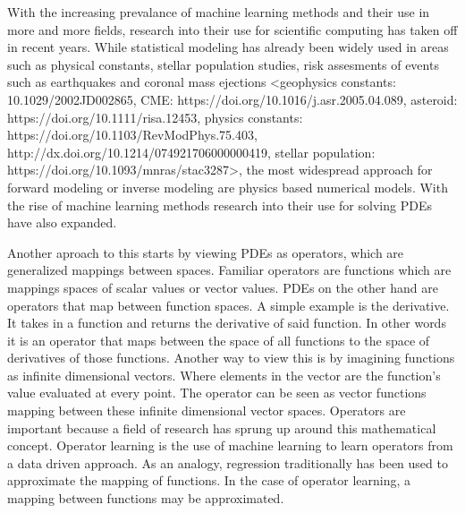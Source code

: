 With the increasing prevalance of machine learning methods and their use in more and more fields, research into their use for scientific computing has taken off in recent years. While statistical modeling has already been widely used in areas such as physical constants, stellar population studies, risk assesments of events such as earthquakes and coronal mass ejections <geophysics constants: 10.1029/2002JD002865, CME: https://doi.org/10.1016/j.asr.2005.04.089, asteroid: https://doi.org/10.1111/risa.12453, physics constants: https://doi.org/10.1103/RevModPhys.75.403, http://dx.doi.org/10.1214/074921706000000419, stellar population: https://doi.org/10.1093/mnras/stac3287>, the most widespread approach for forward modeling or inverse modeling are physics based numerical models. With the rise of machine learning methods research into their use for solving PDEs have also expanded.

Another aproach to this starts by viewing PDEs as operators, which are generalized mappings between spaces. Familiar operators are functions which are mappings spaces of scalar values or vector values. PDEs on the other hand are operators that map between function spaces. A simple example is the derivative. It takes in a function and returns the derivative of said function. In other words it is an operator that maps between the space of all functions to the space of derivatives of those functions. Another way to view this is by imagining functions as infinite dimensional vectors. Where elements in the vector are the function's value evaluated at every point. The operator can be seen as vector functions mapping between these infinite dimensional vector spaces. Operators are important because a field of research has sprung up around this mathematical concept. Operator learning is the use of machine learning to learn operators from a data driven approach. As an analogy, regression traditionally has been used to approximate the mapping of functions. In the case of operator learning, a mapping between functions may be approximated.


